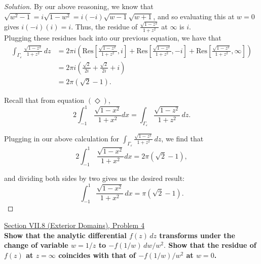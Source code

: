 \documentclass[11pt]{article}
\newenvironment{solution}
  {\renewcommand\qedsymbol{$\blacksquare$}\begin{proof}[Solution]}
  {\end{proof}}
\theoremstyle{definition}
\begin{document}
\begin{solution}
By our above reasoning, we know that $\sqrt{w^2 - 1} = i\sqrt{1-w^2} = i(-i)\sqrt{w-1}\sqrt{w+1}$, and so evaluating this at $w=0$ gives $i(-i)(i) = i.$ 
Thus, the residue of $\frac{\sqrt{1-z^2}}{1+z^2}$ at $\infty$ is $i$. \\

Plugging these residues back into our previous equation, we have that
\begin{align*} \int_{\Gamma_\varepsilon} \frac{\sqrt{1-z^2}}{1+z^2} \, dz &= 2\pi i \left( \mathrm{Res}\left[\frac{\sqrt{1-z^2}}{1+z^2}, i\right]
+ \mathrm{Res}\left[ \frac{\sqrt{1-z^2}}{1+z^2}, -i \right] + \mathrm{Res}\left[ \frac{\sqrt{1-z^2}}{1+z^2}, \infty \right]  \right) \\
&= 2\pi i \left( \frac{\sqrt{2}}{2i} + \frac{\sqrt{2}}{2i} + i \right) \\
&= 2\pi(\sqrt{2} - 1).
\end{align*}

Recall that from equation $(\Diamond)$,
\[ 2\int_{-1}^1 \, \frac{\sqrt{1-x^2}}{1+x^2} dx = \int_{\Gamma_\varepsilon} \frac{\sqrt{1-z^2}}{1+z^2} \, dz. \]

Plugging in our above calculation for $\int_{\Gamma_\varepsilon} \frac{\sqrt{1-z^2}}{1+z^2} \, dz$, we find that
\[  2\int_{-1}^1 \, \frac{\sqrt{1-x^2}}{1+x^2} dx = 2\pi(\sqrt{2} - 1),\]

and dividing both sides by two gives us the desired result:
\[ \boxed{\int_{-1}^1 \frac{\sqrt{1-x^2}}{1+x^2} \, dx = \pi(\sqrt{2} - 1)}.\]
\end{solution}

\newpage

\underline{Section VII.8 (Exterior Domains), Problem 4}\\

\textbf{Show that the analytic differential $f(z) \, dz$ transforms under the change of variable $w=1/z$ to $-f(1/w) \, dw/w^2.$ Show that the residue of $f(z)$ at $z = \infty$
coincides with that of $-f(1/w)/w^2$ at $w=0$.} \\
\end{document}
